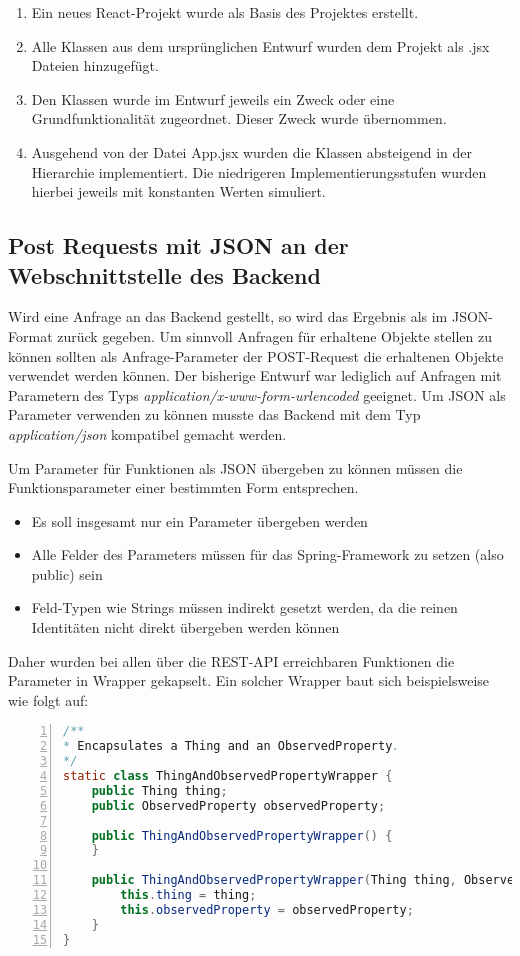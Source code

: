 \begin{enumerate}
    \item Ein neues React-Projekt wurde als Basis des Projektes erstellt.
    \item Alle Klassen aus dem ursprünglichen Entwurf wurden dem Projekt als .jsx Dateien hinzugefügt.
    \item Den Klassen wurde im Entwurf jeweils ein Zweck oder eine Grundfunktionalität zugeordnet. Dieser Zweck wurde übernommen.
    \item Ausgehend von der Datei App.jsx wurden die Klassen absteigend in der Hierarchie implementiert. Die niedrigeren Implementierungsstufen wurden hierbei jeweils mit konstanten Werten simuliert.
\end{enumerate}

\subsection{Post Requests mit JSON an der Webschnittstelle des Backend}
Wird eine Anfrage an das Backend gestellt, so wird das Ergebnis als im \gls{JSON}-Format zurück gegeben.
Um sinnvoll Anfragen für erhaltene Objekte stellen zu können sollten als Anfrage-Parameter der POST-Request die erhaltenen Objekte verwendet werden können.
Der bisherige Entwurf war lediglich auf Anfragen mit Parametern des Typs \textit{application/x-www-form-urlencoded} geeignet.
Um JSON als Parameter verwenden zu können musste das Backend mit dem Typ \textit{application/json} kompatibel gemacht werden.

Um Parameter für Funktionen als JSON übergeben zu können müssen die Funktionsparameter einer bestimmten Form entsprechen.
\begin{itemize}[noitemsep]
    \item Es soll insgesamt nur ein Parameter übergeben werden
    \item Alle Felder des Parameters müssen für das Spring-Framework zu setzen (also public) sein
    \item Feld-Typen wie Strings müssen indirekt gesetzt werden, da die reinen Identitäten nicht direkt übergeben werden können
\end{itemize}
Daher wurden bei allen über die REST-API erreichbaren Funktionen die Parameter in Wrapper gekapselt.
Ein solcher Wrapper baut sich beispielsweise wie folgt auf:
\begin{lstlisting}[language=java,
    basicstyle=\normalfont\ttfamily,
    numbers=left,
    numberstyle=\scriptsize,
    stepnumber=1,
    numbersep=8pt,
    showstringspaces=false,
    breaklines=true,
    frame=lines,
    backgroundcolor=\color{background}]
/**
* Encapsulates a Thing and an ObservedProperty.
*/
static class ThingAndObservedPropertyWrapper {
    public Thing thing;
    public ObservedProperty observedProperty;

    public ThingAndObservedPropertyWrapper() {
    }

    public ThingAndObservedPropertyWrapper(Thing thing, ObservedProperty observedProperty) {
        this.thing = thing;
        this.observedProperty = observedProperty;
    }
}
\end{lstlisting}

